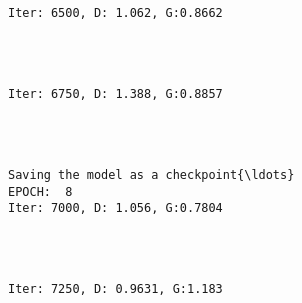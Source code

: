 \documentclass[11pt]{article}
\begin{document}
    \begin{center}
    \end{center}
    { \hspace*{\fill} \\}
    
    \begin{Verbatim}[commandchars=\\\{\}]

Iter: 6500, D: 1.062, G:0.8662
    \end{Verbatim}

    \begin{center}
    \end{center}
    { \hspace*{\fill} \\}
    
    \begin{Verbatim}[commandchars=\\\{\}]

Iter: 6750, D: 1.388, G:0.8857
    \end{Verbatim}

    \begin{center}
    \end{center}
    { \hspace*{\fill} \\}
    
    \begin{Verbatim}[commandchars=\\\{\}]

Saving the model as a checkpoint{\ldots}
EPOCH:  8
Iter: 7000, D: 1.056, G:0.7804
    \end{Verbatim}

    \begin{center}
    \end{center}
    { \hspace*{\fill} \\}
    
    \begin{Verbatim}[commandchars=\\\{\}]

Iter: 7250, D: 0.9631, G:1.183
    \end{Verbatim}
\end{document}
